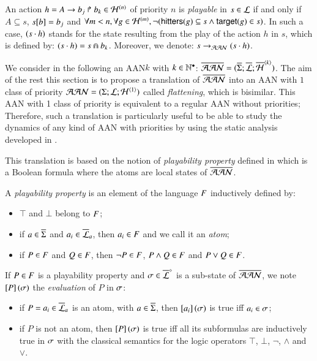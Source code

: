 \begin{definition}
\label{def:playp}
  An action $h = A\rightarrow b_j\Rsh b_k \in \mathcal{H}^{(n)}$ of priority $n$
  is \emph{playable} in $s \in \mathcal{L}$
  if and only if $A \subseteq s$, ${s[b]} = b_j$ and
  $\forall m < n, \forall g \in \mathcal{H}^{(m)},
    \neg (\mathsf{hitters}(g) \subseteq s \wedge \mathsf{target}(g) \in s)$.
  In such a case, $(s \cdot h)$ stands for the state resulting from the play
  of the action $h$ in $s$, which is defined by: $(s \cdot h) = s \Cap b_k$.
  Moreover, we denote: $s \rightarrow_{\mathcal{AAN}} (s \cdot h)$.
\end{definition}

We consider in the following an AAN$k$ with $k \in \mathbb{N}^\bullet$:
$\overline{\mathcal{AAN}} = (\overline{\Sigma}; \overline{\mathcal{L}}; \overline{\mathcal{H}}^{{\langle k \rangle}})$.
The aim of the rest this section is to propose a translation of $\overline{\mathcal{AAN}}$
into an AAN with $1$ class of priority $\mathcal{AAN} = (\Sigma; \mathcal{L}; \mathcal{H}^{{\langle 1 \rangle}})$
called \emph{flattening}, which is bisimilar.
This AAN with 1 class of priority is equivalent to a regular AAN without priorities;
Therefore, such a translation is particularly useful to be able to study the dynamics of
any kind of AAN with priorities by using the static analysis developed in .

This translation is based on the notion of \emph{playability property} defined in 
which is a Boolean formula where the atoms are local states of $\overline{\mathcal{AAN}}$.

\begin{definition}
  \label{def:pp}
  A \emph{playability property} is an element of the language $F$ inductively defined by:
  \begin{itemize}
    \item $\top$ and $\bot$ belong to $F$;
    \item if $a \in \overline{\Sigma}$ and $a_i \in \overline{\mathcal{L}}_a$, then $a_i \in F$ and we call it an \emph{atom};
    \item if $P \in F$ and $Q \in F$, then $\neg P \in F$, $P \wedge Q \in F$ and $P \vee Q \in F$.
  \end{itemize}
  If $P \in F$ is a playability property and $\sigma \in \overline{\mathcal{L}}^{\diamond}$ is a sub-state of $\overline{\mathcal{AAN}}$,
  we note $\left[P\right](\sigma)$ the \emph{evaluation} of $P$ in $\sigma$:
  \begin{itemize}
    \item if $P = a_i \in \overline{\mathcal{L}}_a$ is an atom, with $a \in \overline{\Sigma}$, then $\left[a_i\right](\sigma)$ is true iff $a_i \in \sigma$;
    \item if $P$ is not an atom, then $\left[P\right](\sigma)$ is true iff all its subformulas are inductively true in $\sigma$
      with the classical semantics for the logic operators $\top$, $\bot$, $\neg$, $\wedge$ and $\vee$.
  \end{itemize}
\end{definition}

